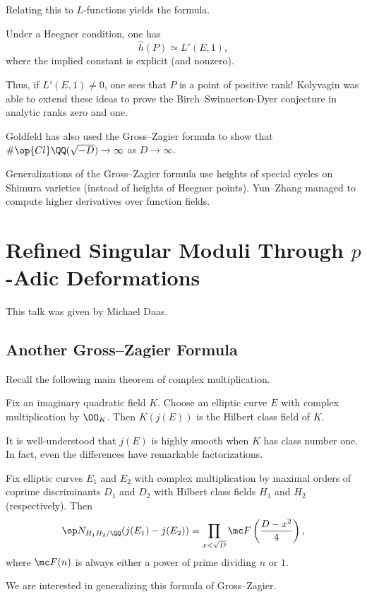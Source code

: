 \documentclass{article}
\begin{document}
Relating this to $L$-functions yields the formula.
\begin{theorem}
	Under a Heegner condition, one has
	\[\hat h(P)\simeq L'(E,1),\]
	where the implied constant is explicit (and nonzero).
\end{theorem}
Thus, if $L'(E,1)\ne0$, one sees that $P$ is a point of positive rank! Kolyvagin was able to extend these ideas to prove the Birch--Swinnerton-Dyer conjecture in analytic ranks zero and one.
\begin{remark}
	Goldfeld has also used the Gross--Zagier formula to show that $\#\op{Cl}\QQ(\sqrt{-D})\to\infty$ as $D\to\infty$.
\end{remark}
\begin{remark}
	Generalizations of the Gross--Zagier formula use heights of special cycles on Shimura varieties (instead of heights of Heegner points). Yun--Zhang managed to compute higher derivatives over function fields.
\end{remark}

\section{Refined Singular Moduli Through \texorpdfstring{$p$}{p}-Adic Deformations}
This talk was given by Michael Daas.

\subsection{Another Gross--Zagier Formula}
Recall the following main theorem of complex multiplication.
\begin{theorem}
	Fix an imaginary quadratic field $K$. Choose an elliptic curve $E$ with complex multiplication by $\OO_K$. Then $K(j(E))$ is the Hilbert class field of $K$.
\end{theorem}
It is well-understood that $j(E)$ is highly smooth when $K$ has class number one. In fact, even the differences have remarkable factorizations.
\begin{theorem} \label{thm:gz-singular-moduli}
	Fix elliptic curves $E_1$ and $E_2$ with complex multiplication by maximal orders of coprime discriminants $D_1$ and $D_2$ with Hilbert class fields $H_1$ and $H_2$ (respectively). Then
	\[\op N_{H_1H_2/\QQ}(j(E_1)-j(E_2))=\prod_{x<\sqrt D}\mc F\left(\frac{D-x^2}4\right),\]
	where $\mc F(n)$ is always either a power of prime dividing $n$ or $1$.
\end{theorem}
We are interested in generalizing this formula of Gross--Zagier.
\end{document}

